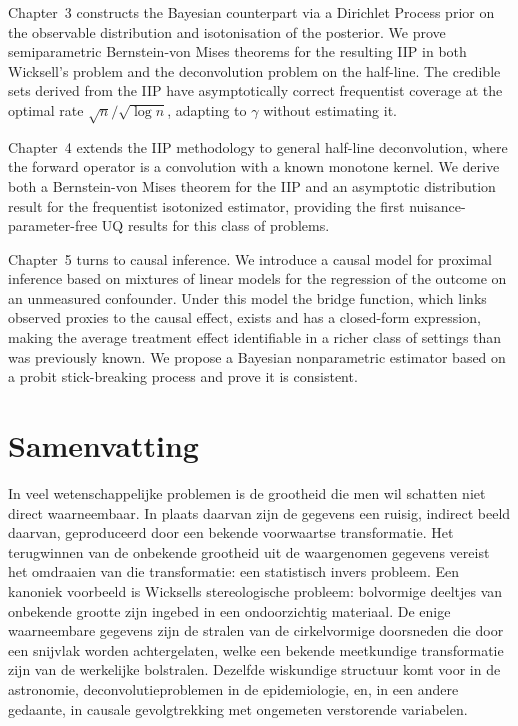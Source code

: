 Chapter~3 constructs the Bayesian counterpart via a Dirichlet Process prior on the observable distribution and isotonisation of the posterior. We prove semiparametric Bernstein-von Mises theorems for the resulting IIP in both Wicksell's problem and the deconvolution problem on the half-line. The credible sets derived from the IIP have asymptotically correct frequentist coverage at the optimal rate $\sqrt{n}/\sqrt{\log n}$, adapting to $\gamma$ without estimating it. 

Chapter~4 extends the IIP methodology to general half-line deconvolution, where the forward operator is a convolution with a known monotone kernel. We derive both a Bernstein-von Mises theorem for the IIP and an asymptotic distribution result for the frequentist isotonized estimator, providing the first nuisance-parameter-free UQ results for this class of problems.

Chapter~5 turns to causal inference. We introduce a causal model for proximal inference based on mixtures of linear models for the regression of the outcome on an unmeasured confounder. Under this model the bridge function, which links observed proxies to the causal effect, exists and has a closed-form expression, making the average treatment effect identifiable in a richer class of settings than was previously known. We propose a Bayesian nonparametric estimator based on a probit stick-breaking process and prove it is consistent.


\chapter{Samenvatting}

In veel wetenschappelijke problemen is de grootheid die men wil schatten niet direct waarneembaar. In plaats daarvan zijn de gegevens een ruisig, indirect beeld daarvan, geproduceerd door een bekende voorwaartse transformatie. Het terugwinnen van de onbekende grootheid uit de waargenomen gegevens vereist het omdraaien van die transformatie: een statistisch invers probleem. Een kanoniek voorbeeld is Wicksells stereologische probleem: bolvormige deeltjes van onbekende grootte zijn ingebed in een ondoorzichtig materiaal. De enige waarneembare gegevens zijn de stralen van de cirkelvormige doorsneden die door een snijvlak worden achtergelaten, welke een bekende meetkundige transformatie zijn van de werkelijke bolstralen. Dezelfde wiskundige structuur komt voor in de astronomie, deconvolutieproblemen in de epidemiologie, en, in een andere gedaante, in causale gevolgtrekking met ongemeten verstorende variabelen.

